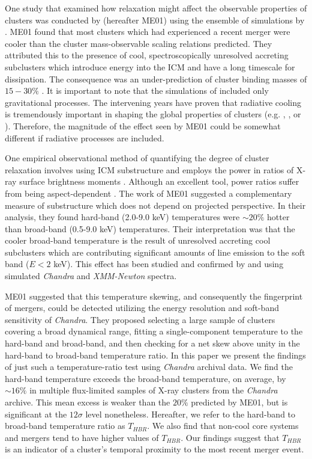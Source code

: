 \documentclass[12pt,preprint]{aastex}
\begin{document}
One study that examined how relaxation might affect the observable
properties of clusters was conducted by \citealt{2001ApJ...546..100M}
(hereafter ME01) using the ensemble of simulations by
\citealt{1997ApJ...491...38M}. ME01 found that most clusters which had
experienced a recent merger were cooler than the cluster
mass-observable scaling relations predicted. They attributed this to the
presence of cool, spectroscopically unresolved accreting subclusters
which introduce energy into the ICM and have a long timescale for
dissipation. The consequence was an under-prediction of cluster
binding masses of $15-30\%$ \citep{2001ApJ...546..100M}. It is
important to note that the simulations of \cite{1997ApJ...491...38M}
included only gravitational processes. The intervening years have
proven that radiative cooling is tremendously important in shaping the
global properties of clusters (e.g. \citealt{2004ApJ...613..811M},
\citealt{2006MNRAS.373..881P}, or
\citealt{2007ApJ...668....1N}). Therefore, the magnitude of the effect
seen by ME01 could be somewhat different if radiative processes are
included.

One empirical observational method of quantifying the degree of
cluster relaxation involves using ICM substructure and employs the power in
ratios of X-ray surface brightness moments \citep{1995ApJ...452..522B,
1996ApJ...458...27B, 2005ApJ...624..606J}. Although an excellent tool,
power ratios suffer from being aspect-dependent
\citep{2007arXiv0708.1518J, VV08}. The work of ME01 suggested a
complementary measure of substructure which does not depend on
projected perspective. In their analysis, they found hard-band
(2.0-9.0 keV) temperatures were $\sim 20\%$ hotter than broad-band
(0.5-9.0 keV) temperatures. Their interpretation was that the cooler
broad-band temperature is the result of unresolved accreting cool
subclusters which are contributing significant amounts of line
emission to the soft band ($E < 2$ keV). This effect has been studied
and confirmed by \cite{2004MNRAS.354...10M} and
\cite{2006ApJ...640..710V} using simulated {\it Chandra} and
{\it{XMM-Newton}} spectra.

ME01 suggested that this temperature skewing, and consequently the
fingerprint of mergers, could be detected utilizing the energy
resolution and soft-band sensitivity of {\it Chandra}. They proposed
selecting a large sample of clusters covering a broad dynamical range,
fitting a single-component temperature to the hard-band and
broad-band, and then checking for a net skew above unity in the
hard-band to broad-band temperature ratio. In this paper we present
the findings of just such a temperature-ratio test using {\it Chandra}
archival data. We find the hard-band  temperature exceeds the
broad-band temperature, on average, by $\sim16\%$ in multiple
flux-limited samples of X-ray clusters from the {\it Chandra}
archive. This mean excess is weaker than the $20\%$ predicted by ME01,
but is significant at the $12\sigma$ level nonetheless. Hereafter, we
refer to the hard-band to broad-band temperature ratio as
$T_{HBR}$. We also find that non-cool core systems and mergers tend to
have higher values of $T_{HBR}$. Our findings suggest that $T_{HBR}$
is an indicator of a cluster's temporal proximity to the most recent
merger event.
\end{document}

